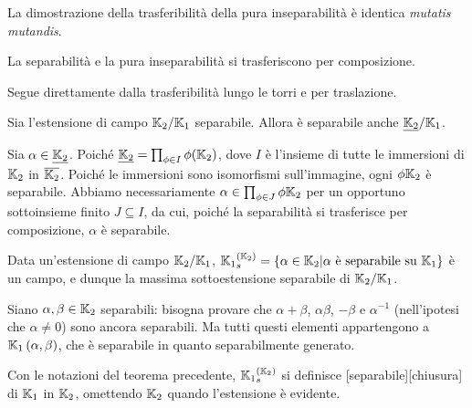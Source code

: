 \par La dimostrazione della trasferibilit\`a della pura inseparabilit\`a \`e identica \textit{mutatis mutandis}. \EndProof
\begin{Theorem}
	La separabilit\`a e la pura inseparabilit\`a si trasferiscono per composizione.
\end{Theorem}
\Proof Segue direttamente dalla trasferibilit\`a lungo le torri e per traslazione. \EndProof
\begin{Theorem}
	Sia l'estensione di campo $\mathbb{K}_2/\mathbb{K}_1$ separabile. Allora \`e separabile anche $\FieldExtension{\NormalClosure{\Field_2}}{\Field_1}$.
\end{Theorem}
\Proof Sia $\alpha \in \NormalClosure{\Field_2}$. Poich\'e $\NormalClosure{\Field_2} = \prod_{\phi \in I} \phi(\Field_2)$, dove $I$ \`e l'insieme di tutte le immersioni di $\mathbb{K}_2$ in $\overline{\mathbb{K}_2}$. Poich\'e le immersioni sono isomorfismi sull'immagine, ogni $\phi{\mathbb{K}_2}$ \`e separabile. Abbiamo necessariamente $\alpha \in \prod_{\phi \in J} \phi{\mathbb{K}_2}$ per un opportuno sottoinsieme finito $J \subseteq I$, da cui, poich\'e la separabilit\`a si trasferisce per composizione, $\alpha$ \`e separabile. \EndProof
\begin{Theorem}
	Data un'estensione di campo $\mathbb{K}_2/\mathbb{K}_1$, $\SeparableClosure{\Field_1}[\Field_2] = \lbrace \alpha \in \Field_2 | \alpha\text{ \`e separabile su }\Field_1 \rbrace$ \`e un campo, e dunque la massima sottoestensione separabile di $\mathbb{K}_2/\mathbb{K}_1$.
\end{Theorem}
\Proof Siano $\alpha, \beta \in \mathbb{K}_2$ separabili: bisogna provare che $\alpha + \beta$, $\alpha\beta$, $- \beta$ e $\alpha^{-1}$ (nell'ipotesi che $\alpha \neq 0$) sono ancora separabili. Ma tutti questi elementi appartengono a $\mathbb{K}_1 \left ( \alpha,\beta \right )$, che \`e separabile in quanto separabilmente generato. \EndProof
\begin{Definition}
	Con le notazioni del teorema precedente, $\SeparableClosure{\Field_1}[\Field_2]$ si definisce [separabile][chiusura] di $\mathbb{K}_1$ in $\mathbb{K}_2$, omettendo $\mathbb{K}_2$ quando l'estensione \`e evidente.
\end{Definition}
